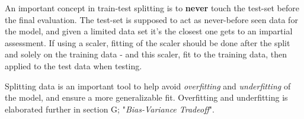 An important concept in train-test splitting is to \textbf{never} touch the test-set before the final evaluation. The test-set is supposed to act as never-before seen data for the model, and given a limited data set it's the closest one gets to an impartial assessment. 
If using a scaler, fitting of the scaler should be done after the split and solely on the training data - and this scaler, fit to the training data, then applied to the test data when testing. 

Splitting data is an important tool to help avoid \textit{overfitting} and \textit{underfitting} of the model, and ensure a more generalizable fit. Overfitting and underfitting is elaborated further in  section G; "\textit{Bias-Variance Tradeoff}".










